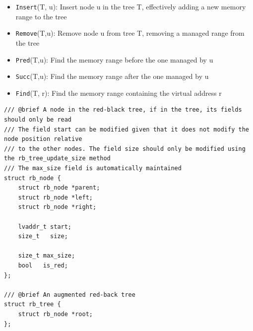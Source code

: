 \begin{itemize}
    \item \verb|Insert|(T, u): Insert node u in the tree T, effectively adding a new memory range to the tree
    \item \verb|Remove|(T,u): Remove node u from tree T, removing a managed range from the tree
    \item \verb|Pred|(T,u): Find the memory range before the one managed by u
    \item \verb|Succ|(T,u): Find the memory range after the one managed by u
    \item \verb|Find|(T, r): Find the memory range containing the virtual address r
\end{itemize}


\begin{lstlisting}[caption={The red-black tree node},label={listing:shadow_pt}]
/// @brief A node in the red-black tree, if in the tree, its fields should only be read
/// The field start can be modified given that it does not modify the node position relative
/// to the other nodes. The field size should only be modified using the rb_tree_update_size method
/// The max_size field is automatically maintained
struct rb_node {
    struct rb_node *parent;
    struct rb_node *left;
    struct rb_node *right;

    lvaddr_t start;
    size_t   size;

    size_t max_size;
    bool   is_red;
};

/// @brief An augmented red-back tree
struct rb_tree {
    struct rb_node *root;
};
\end{lstlisting}


